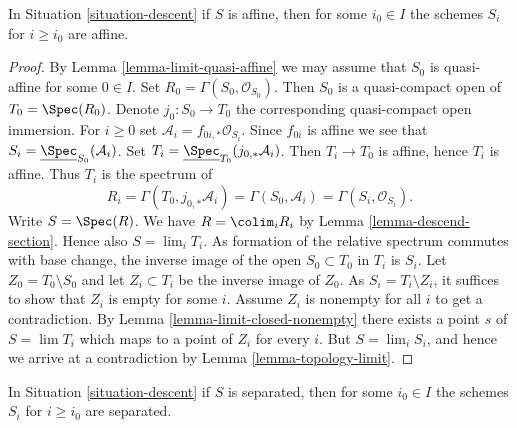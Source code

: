\begin{lemma}
\label{lemma-limit-affine}
In Situation \ref{situation-descent} if $S$ is affine,
then for some $i_0 \in I$ the schemes $S_i$ for $i \geq i_0$
are affine.
\end{lemma}

\begin{proof}
By Lemma \ref{lemma-limit-quasi-affine} we may assume that $S_0$ is
quasi-affine for some $0 \in I$. Set $R_0 = \Gamma(S_0, \mathcal{O}_{S_0})$.
Then $S_0$ is a quasi-compact open of $T_0 = \Spec(R_0)$. Denote
$j_0 : S_0 \to T_0$ the corresponding quasi-compact open immersion.
For $i \geq 0$ set $\mathcal{A}_i = f_{0i, *}\mathcal{O}_{S_i}$.
Since $f_{0i}$ is affine we see that
$S_i = \underline{\Spec}_{S_0}(\mathcal{A}_i)$.
Set $T_i = \underline{\Spec}_{T_0}(j_{0, *}\mathcal{A}_i)$.
Then $T_i \to T_0$ is affine, hence $T_i$ is affine. Thus
$T_i$ is the spectrum of
$$
R_i = \Gamma(T_0, j_{0, *}\mathcal{A}_i) = \Gamma(S_0, \mathcal{A}_i) =
\Gamma(S_i, \mathcal{O}_{S_i}).
$$
Write $S = \Spec(R)$. We have $R = \colim_i R_i$
by Lemma \ref{lemma-descend-section}.
Hence also $S = \lim_i T_i$. As formation of the relative spectrum commutes
with base change, the inverse image
of the open $S_0 \subset T_0$ in $T_i$ is $S_i$.
Let $Z_0 = T_0 \setminus S_0$ and let $Z_i \subset T_i$
be the inverse image of $Z_0$. As $S_i = T_i \setminus Z_i$, it suffices
to show that $Z_i$ is empty for some $i$. Assume $Z_i$ is nonempty for all
$i$ to get a contradiction. By Lemma \ref{lemma-limit-closed-nonempty}
there exists a point $s$ of $S = \lim T_i$ which maps to a point of $Z_i$
for every $i$. But $S = \lim_i S_i$, and hence we arrive at a contradiction
by Lemma \ref{lemma-topology-limit}.
\end{proof}

\begin{lemma}
\label{lemma-limit-separated}
In Situation \ref{situation-descent} if $S$ is separated,
then for some $i_0 \in I$ the schemes $S_i$ for $i \geq i_0$
are separated.
\end{lemma}

